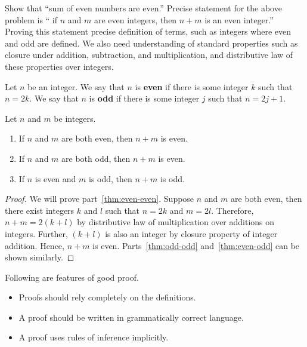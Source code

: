 \documentclass[a4paper,english,12pt]{article}
\begin{document}
\begin{exmp} Show that ``sum of even numbers are even.'' Precise statement for the above problem is `` if $n$ and $m$ are even integers, then $n+m$ is an even integer.''\\
Proving this statement precise definition of terms, such as integers where even and odd are defined. We also need understanding of standard properties such as closure under addition, subtraction, and multiplication, and distributive law of these properties over integers.
\end{exmp}
\begin{defn}Let $n$ be an integer. We say that $n$ is \textbf{even} if there is some integer $k$ such that $n=2k$. We say that $n$ is \textbf{odd} if there is some integer $j$ such that $n = 2j+1$.
\end{defn}
\begin{thm} Let $n$ and $m$ be integers.
\begin{enumerate}[i]
	\item \label{thm:even-even} If $n$ and $m$ are both even, then $n+m$ is even.
	\item \label{thm:odd-odd}If $n$ and $m$ are both odd, then $n+m$ is even.
	\item \label{thm:even-odd} If $n$ is even and $m$ is odd, then $n+m$ is odd.
\end{enumerate}
\end{thm}
\begin{proof}
We will prove part~\ref{thm:even-even}. Suppose $n$ and $m$ are both even, then there exist integers $k$ and $l$ such that $n=2k$ and $m=2l$. Therefore, $n+m=2(k+l)$ by distributive law of multiplication over additions on integers. Further, $(k+l)$ is also an integer by closure property of integer addition. Hence, $n+m$ is even. Parts~\ref{thm:odd-odd} and~\ref{thm:even-odd} can be shown similarly.
\end{proof}

Following are features of good proof. 
\begin{itemize}
\item Proofs should rely completely on the definitions.
\item A proof should be written in grammatically correct language.
\item A proof uses rules of inference implicitly.
\end{itemize}
\end{document}
